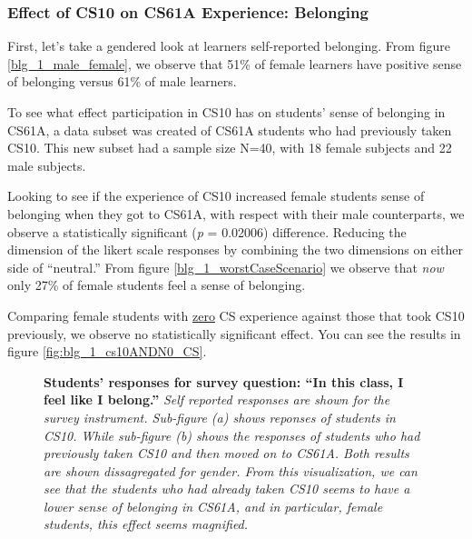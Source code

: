 \documentclass[twoside,openright,titlepage,numbers=noenddot,headinclude,%
               footinclude=true,cleardoublepage=empty,abstractoff,BCOR=5mm,%
               paper=a4,fontsize=11pt,ngerman,american]{scrreprt}
\numberwithin{theorem}{chapter}
\numberwithin{definition}{chapter}
\numberwithin{algorithm}{chapter}
\numberwithin{figure}{chapter}
\numberwithin{table}{chapter}
\numberwithin{equation}{chapter}
\begin{document}
\subsubsection *{Effect of CS10 on CS61A Experience: Belonging}
First, let's take a gendered look at learners self-reported belonging. From figure \ref{blg_1_male_female}, we observe that 51\% of female learners have positive sense of belonging versus 61\% of male learners.

To see what effect participation in CS10 has on students' sense of belonging in CS61A, a data subset was created of CS61A students who had previously taken CS10. This new subset had a sample size N=40, with 18 female subjects and 22 male subjects.

Looking to see if the experience of CS10 increased female students sense of belonging when they got to CS61A, with respect with their male counterparts, we observe a statistically significant (\emph{p} = 0.02006) difference. Reducing the dimension of the likert scale responses by combining the two dimensions on either side of ``neutral.'' From figure \ref{blg_1_worstCaseScenario} we observe that \emph{now} only 27\% of female students feel a sense of belonging.

Comparing female students with \underline{zero} CS experience against those that took CS10 previously, we observe no statistically significant effect. You can see the results in figure \ref{fig:blg_1_cs10ANDN0_CS}.

\begin{figure}[!htbp]
    \centering
  
%
\caption{\textbf{Students' responses for survey question: ``In this class, I feel like I belong.''} \textit{Self reported responses are shown for the survey instrument. Sub-figure (a) shows reponses of students in CS10. While sub-figure (b) shows the responses of students who had previously taken CS10 and then moved on to CS61A. Both results are shown dissagregated for gender. From this visualization, we can see that the students who had already taken CS10 seems to have a lower sense of belonging in CS61A, and in particular, female students, this effect seems magnified.}}
\label{fig:blg_1_cs10_cs61a}
\end{figure}


\end{document}
